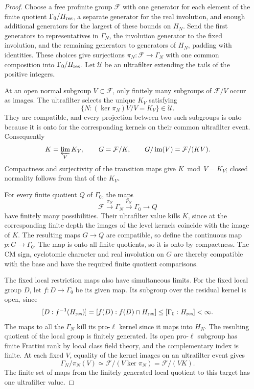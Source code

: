 \begin{proof}
Choose a free profinite group \(\mathcal F\) with one generator
for each element of the finite quotient \(\Gamma_0/H_{\rm res}\), a
separate generator for the real involution, and enough additional
generators for the largest of these bounds on \(H_N\). Send
the first generators to representatives in \(\Gamma_N\), the
involution generator to the fixed involution, and the remaining
generators to generators of \(H_N\), padding with identities.
These choices give surjections \(\pi_N:\mathcal F\to\Gamma_N\)
with one common composition into \(\Gamma_0/H_{\rm res}\).
Let \(\mathcal U\) be an ultrafilter extending the tails of the
positive integers.

At an open normal subgroup \(V\subset\mathcal F\), only finitely many subgroups of \(\mathcal F/V\) occur as images. The ultrafilter selects the unique \(K_V\) satisfying
\[
 \{N:(\ker\pi_N)V/V=K_V\}\in\mathcal U .
\]
They are compatible, and every projection between two such
subgroups is onto because it is onto for the corresponding
kernels on their common ultrafilter event. Consequently
\[
 K=\varprojlim_V K_V,\qquad G=\mathcal F/K,\qquad
 G/\operatorname{im}(V)=\mathcal F/(KV).
\]
Compactness and surjectivity of the transition maps give
\(K\bmod V=K_V\); closed normality follows from that of the
\(K_V\).

For every finite quotient \(Q\) of \(\Gamma_0\), the
maps
\[
 \mathcal F\xrightarrow{\pi_N}\Gamma_N \xrightarrow{p_N}\Gamma_0\to Q
\]
have finitely many
possibilities. Their ultrafilter value kills \(K\), since at
the corresponding finite depth the images of the level kernels
coincide with the image of \(K\). The resulting maps \(G\to Q\)
are compatible, so define the continuous map \(p:G\to\Gamma_0\). The map is onto all finite quotients, so it is onto
by compactness. The CM sign, cyclotomic character and real
involution on \(G\) are thereby compatible with the base and
have the required finite quotient comparisons.

The fixed local restriction maps also have simultaneous limits.
For the fixed local group \(D\), let \(f:D\to\Gamma_0\) be its given map. Its subgroup over the residual kernel is open, since
\[
 [D:f^{-1}(H_{\rm res})]=[f(D):f(D)\cap H_{\rm res}]\le[\Gamma_0:H_{\rm res}]<\infty .
\] The maps to all the
\(\Gamma_N\) kill its pro-\(\ell\) kernel since it maps into
\(H_N\). The resulting quotient of the local group is finitely
generated. Its open pro-\(\ell\) subgroup has finite Frattini
rank by local class field theory, and the complementary index is
finite. At each fixed \(V\), equality of the kernel images on an ultrafilter event gives 
\[
 \Gamma_N/\pi_N(V)\simeq\mathcal F/(V\ker\pi_N)=\mathcal F/(VK).
\]
 The finite set of maps from the finitely
generated local quotient to this target has one ultrafilter
value.


\end{proof}
